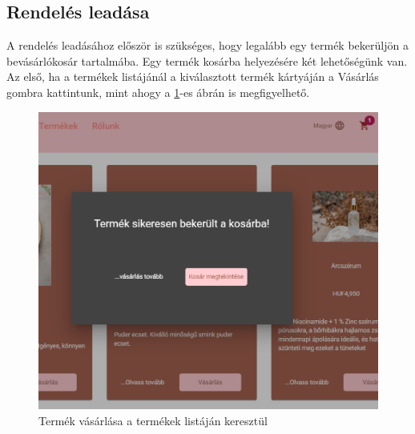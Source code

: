 \subsection{Rendelés leadása}
A rendelés leadásához először is szükséges, hogy legalább egy termék bekerüljön a bevásárlókosár tartalmába. Egy termék kosárba helyezésére két lehetőségünk van. Az első, ha a termékek listájánál a kiválasztott termék kártyáján a Vásárlás gombra kattintunk, mint ahogy a \ref{fig.exemple-9}-es ábrán is megfigyelhető.
\begin{figure}[H]
	\centering
	\includegraphics[width=1.0\textwidth]{images/termek_vasarlas_1.png}
	\caption{Termék vásárlása a termékek listáján keresztül}
	\label{fig.exemple-9}
\end{figure}

